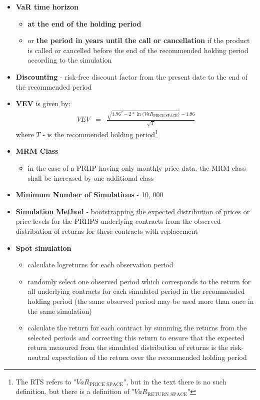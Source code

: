 \begin{itemize}
	\item \textbf{VaR time horizon}
	\begin{itemize}
		\item \textbf{\color{blue}at the end of the holding period}
		\item or \textbf{\color{blue}the period in years until the call or cancellation} if the product is
		called or cancelled before the end of the recommended holding period according to the simulation
	\end{itemize}
	\item \textbf{Discounting} - risk-free discount factor from the present date to the end of the recommended period
	\item \textbf{VEV} is given by:
	\begin{eqnarray}
		VEV &=& \frac{\sqrt{1.96^{2} - 2 * \ln{\Big(VaR_{\text{PRICE SPACE}}\Big)}} - 1.96}{\sqrt{T}}
	\end{eqnarray}
	where $T$ - is the recommended holding period\footnote{The RTS refers to "$VaR_{\text{PRICE SPACE}}$", but in the text there is no such definition, but there is a definition of "$VaR_{\text{RETURN SPACE}}$"}
	\item \textbf{MRM Class}
	\begin{itemize}
		\item in the case of a PRIIP having only monthly price data, the MRM class shall be increased by one additional class 
	\end{itemize}
	\item \textbf{Minimum Number of Simulations} - 10, 000
	\item \textbf{Simulation Method} - bootstrapping the expected distribution of prices or price levels for the PRIIPS underlying contracts from the observed distribution of returns for these contracts with replacement
	\item \textbf{Spot simulation}
	\begin{itemize}
		\item calculate logreturns for each observation period
		\item randomly select one observed period which corresponds to the return for all underlying contracts for each simulated period in the recommended holding period (the same observed period may be used more than once in the same simulation)
		\item calculate the return for each contract by summing the returns from the selected periods and correcting this return to ensure that the expected return measured from the simulated distribution of returns is the risk-neutral expectation of the return over the recommended holding period

\end{itemize}
\end{itemize}
